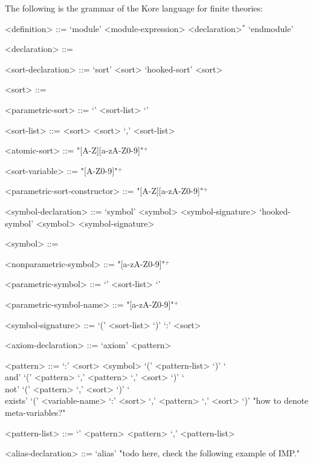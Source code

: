 \documentclass[UTF8,11pt]{article}
\theoremstyle{plain}
\theoremstyle{definition}
\theoremstyle{remark}
\begin{document}
The following is the grammar of the Kore language for finite theories:

\begin{grammar}\small
	<definition>    ::= \quad
	\alt `module' <module-expression> <declaration>$^*$ `endmodule'
	
	<declaration>   ::= \quad
	\alt <sort-declaration> 
	\alt <symbol-declaration> 
	\alt <axiom-declaration>
	\alt <alias-declaration>
	
	<sort-declaration> ::= \quad
	\alt `sort' <sort>
	\alt `hooked-sort' <sort> 
	
	<sort> ::= \quad
	\alt <atomic-sort> 
	\alt <parametric-sort>
	
	<parametric-sort> ::= \quad
	\alt <parametric-sort-constructor> `{' <sort-list> `}'
	
	<sort-list> ::= \quad 
	\alt <sort> 
	\alt <sort> `,' <sort-list>
	
	<atomic-sort> ::= "[A-Z][a-zA-Z0-9]"$^+$
	
	<sort-variable> ::= "[A-Z0-9]"$^+$
	
	<parametric-sort-constructor> ::= "[A-Z][a-zA-Z0-9]"$^+$
	
	<symbol-declaration> ::= \quad
    \alt `symbol' <symbol> <symbol-signature>
    \alt `hooked-symbol' <symbol> <symbol-signature>
    
    <symbol> ::= \quad
    
    <nonparametric-symbol> ::= "[a-zA-Z0-9]"$^+$
    
    <parametric-symbol> ::= \quad
     `{' <sort-list> `}'
    
    <parametric-symbol-name> ::= "[a-zA-Z0-9]"$^+$
	
	<symbol-signature> ::= \quad
	\alt `(' <sort-list> `)' `:' <sort>
	
	<axiom-declaration> ::= \quad
	\alt `axiom' <pattern>
	
	<pattern> ::= \quad
	\alt <variable-name> `:' <sort>
	\alt <symbol> `(' <pattern-list> `)'
	\alt `\\and' `(' <pattern> `,' <pattern> `,' <sort> `)'
	\alt `\\not' `(' <pattern> `,' <sort> `)' 
	\alt `\\exists' `(' <variable-name> `:' <sort> `,' <pattern> `,' <sort> `)'
	\alt "how to denote meta-variables?"
	
	<pattern-list> ::= \quad
	\alt `' 
	\alt <pattern> 
	\alt <pattern> `,' <pattern-list>
	
	<alias-declaration> ::= \quad
	\alt `alias' "todo here, check the following example of IMP."
\end{grammar}
\end{document}
